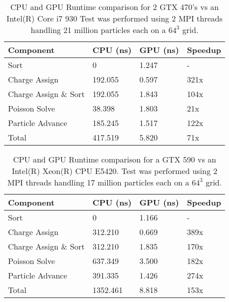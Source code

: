 \begin{table}[ht]
\begin{tabular}{| p{4.0cm} | p{3.5cm} | p{2.5cm} | p{4.0cm} |}
\hline
Component & CPU (ns) & GPU (ns) & Speedup \\ \hline
Sort & 0 & 1.247 & - \\ \hline
Charge Assign & 192.055 & 0.597 & 321x \\ \hline
Charge Assign \& Sort & 192.055 & 1.843 & 104x \\ \hline
Poisson Solve & 38.398 & 1.803 & 21x \\ \hline
Particle Advance & 185.245 & 1.517 & 122x \\ \hline
Total\footnote[1] & 417.519 & 5.820 & 71x \\ \hline
\end{tabular}
\caption{CPU and GPU Runtime comparison for 2 GTX 470's vs an Intel(R) Core i7 930 Test was performed using 2 MPI threads handling 21 million particles each on a $64^3$ grid.}
\label{tab:speedup} 
\end{table}

\begin{table}[ht]
\begin{tabular}{| p{4.0cm} | p{3.5cm} | p{2.5cm} | p{4.0cm} |}
\hline
Component & CPU (ns) & GPU (ns) & Speedup \\ \hline
Sort & 0 & 1.166 & - \\ \hline
Charge Assign & 312.210 & 0.669 & 389x \\ \hline
Charge Assign \& Sort & 312.210 & 1.835 & 170x \\ \hline
Poisson Solve & 637.349 & 3.500 & 182x \\ \hline
Particle Advance & 391.335 & 1.426 & 274x \\ \hline
Total\footnote[1] & 1352.461 & 8.818 & 153x \\ \hline
\end{tabular}
\caption[CPU and GPU Runtime comparison 2]{CPU and GPU Runtime comparison for a GTX 590 vs an Intel(R) Xeon(R) CPU E5420. Test was performed using 2 MPI threads handling 17 million particles each on a $64^3$ grid.}
\label{tab:speedup2} 
\end{table} 




\clearpage
